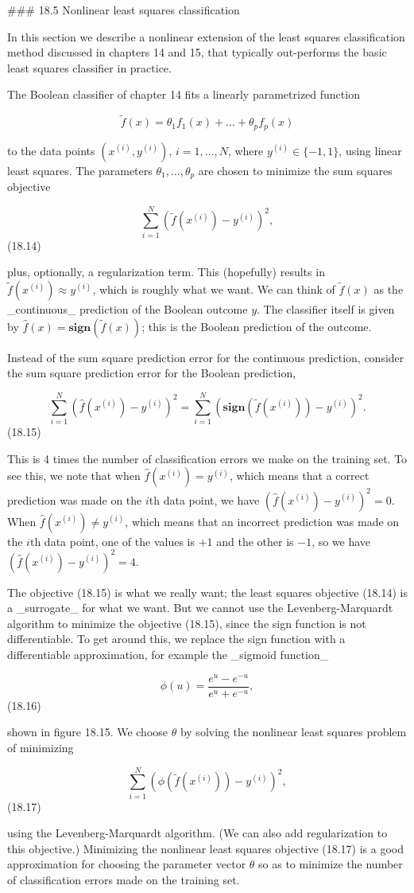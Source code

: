 

### 18.5 Nonlinear least squares classification

In this section we describe a nonlinear extension of the least squares classification method discussed in chapters 14 and 15, that typically out-performs the basic least squares classifier in practice.

The Boolean classifier of chapter 14 fits a linearly parametrized function

\[\tilde{f}(x)=\theta_{1}f_{1}(x)+\dots+\theta_{p}f_{p}(x)\]

to the data points \((x^{(i)},y^{(i)})\), \(i=1,\dots,N\), where \(y^{(i)}\in\{-1,1\}\), using linear least squares. The parameters \(\theta_{1},\dots,\theta_{p}\) are chosen to minimize the sum squares objective

\[\sum_{i=1}^{N}(\tilde{f}(x^{(i)})-y^{(i)})^{2},\] (18.14)

plus, optionally, a regularization term. This (hopefully) results in \(\tilde{f}(x^{(i)})\approx y^{(i)}\), which is roughly what we want. We can think of \(\tilde{f}(x)\) as the _continuous_ prediction of the Boolean outcome \(y\). The classifier itself is given by \(\hat{f}(x)=\mathbf{sign}(\tilde{f}(x))\); this is the Boolean prediction of the outcome.

Instead of the sum square prediction error for the continuous prediction, consider the sum square prediction error for the Boolean prediction,

\[\sum_{i=1}^{N}(\hat{f}(x^{(i)})-y^{(i)})^{2}=\sum_{i=1}^{N}(\mathbf{sign}( \tilde{f}(x^{(i)}))-y^{(i)})^{2}.\] (18.15)

This is 4 times the number of classification errors we make on the training set. To see this, we note that when \(\hat{f}(x^{(i)})=y^{(i)}\), which means that a correct prediction was made on the \(i\)th data point, we have \((\hat{f}(x^{(i)})-y^{(i)})^{2}=0\). When \(\hat{f}(x^{(i)})\neq y^{(i)}\), which means that an incorrect prediction was made on the \(i\)th data point, one of the values is \(+1\) and the other is \(-1\), so we have \((\hat{f}(x^{(i)})-y^{(i)})^{2}=4\).

The objective (18.15) is what we really want; the least squares objective (18.14) is a _surrogate_ for what we want. But we cannot use the Levenberg-Marquardt algorithm to minimize the objective (18.15), since the sign function is not differentiable. To get around this, we replace the sign function with a differentiable approximation, for example the _sigmoid function_

\[\phi(u)=\frac{e^{u}-e^{-u}}{e^{u}+e^{-u}},\] (18.16)

shown in figure 18.15. We choose \(\theta\) by solving the nonlinear least squares problem of minimizing

\[\sum_{i=1}^{N}(\phi(\tilde{f}(x^{(i)}))-y^{(i)})^{2},\] (18.17)

using the Levenberg-Marquardt algorithm. (We can also add regularization to this objective.) Minimizing the nonlinear least squares objective (18.17) is a good approximation for choosing the parameter vector \(\theta\) so as to minimize the number of classification errors made on the training set.

